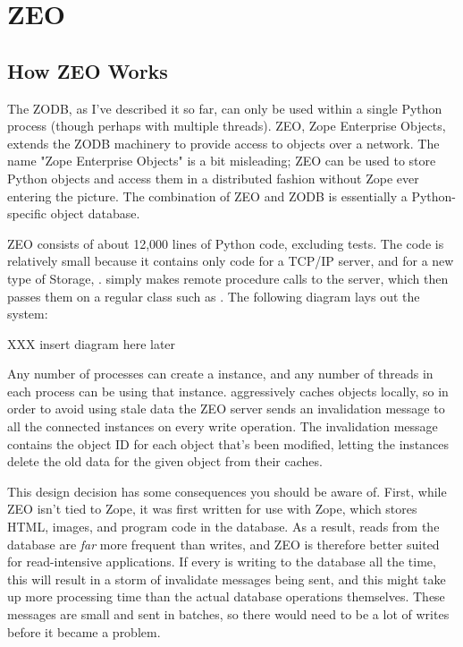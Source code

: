 
   
\section{ZEO}
\label{zeo}

\subsection{How ZEO Works}

The ZODB, as I've described it so far, can only be used within a
single Python process (though perhaps with multiple threads).  ZEO,
Zope Enterprise Objects, extends the ZODB machinery to provide access
to objects over a network.  The name "Zope Enterprise Objects" is a
bit misleading; ZEO can be used to store Python objects and access
them in a distributed fashion without Zope ever entering the picture.
The combination of ZEO and ZODB is essentially a Python-specific
object database.

ZEO consists of about 12,000 lines of Python code, excluding tests.  The
code is relatively small because it contains only code for a TCP/IP
server, and for a new type of Storage, .
 simply makes remote procedure calls to the
server, which then passes them on a regular  class such
as .  The following diagram lays out the system:

XXX insert diagram here later

Any number of processes can create a 
instance, and any number of threads in each process can be using that
instance.   aggressively caches objects
locally, so in order to avoid using stale data the ZEO server sends
an invalidation message to all the connected 
instances on every write operation.  The invalidation message contains
the object ID for each object that's been modified, letting the
 instances delete the old data for the
given object from their caches.

This design decision has some consequences you should be aware of.
First, while ZEO isn't tied to Zope, it was first written for use with
Zope, which stores HTML, images, and program code in the database.  As
a result, reads from the database are \emph{far} more frequent than
writes, and ZEO is therefore better suited for read-intensive
applications.  If every  is writing to the
database all the time, this will result in a storm of invalidate
messages being sent, and this might take up more processing time than
the actual database operations themselves. These messages are
small and sent in batches, so there would need to be a lot of writes
before it became a problem.

